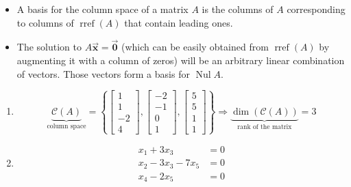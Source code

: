\documentclass[letter,11pt]{article}
\theoremstyle{definition}
\begin{document}
\begin{tcolorbox}[boxrule=1mm, width=(.9\linewidth),before=\hfill,after=\hfill,adjusted title={Problem 6 Solutions}]
\begin{itemize}
    \item A basis for the column space of a matrix $A$ is the columns of $A$ corresponding to columns of $\operatorname{rref}(A)$ that contain leading ones.
    \item The solution to $A\vec{\boldsymbol{x}} = \vec{\boldsymbol{0}}$ (which can be easily obtained from $\operatorname{rref}(A)$ by augmenting it with a column of zeros) will be an arbitrary linear combination of vectors. Those vectors form a basis for $\operatorname{Nul} A$.
\end{itemize}
\tcblower
\begin{enumerate}[label = \roman*.]
    \item $$\underbrace{\mathcal{C}(A)}_{\text{column space}} = \left\{\begin{bmatrix}1\\1\\-2\\4 \end{bmatrix},\begin{bmatrix}-2\\-1\\0\\1 \end{bmatrix},\begin{bmatrix}5\\5\\1\\1 \end{bmatrix} \right\} \Longrightarrow \underbrace{\operatorname{dim}(\mathcal{C}(A))}_{\text{rank of the matrix}}  = 3 $$
    \item 
        \begin{align*}
            x_{1}+3x_{3} &= 0\\
            x_{2}-3x_{3}-7x_{5} &=0\\
            x_{4}-2x_{5} &=0
        \end{align*}
        

\end{enumerate}
\end{tcolorbox}
\end{document}
